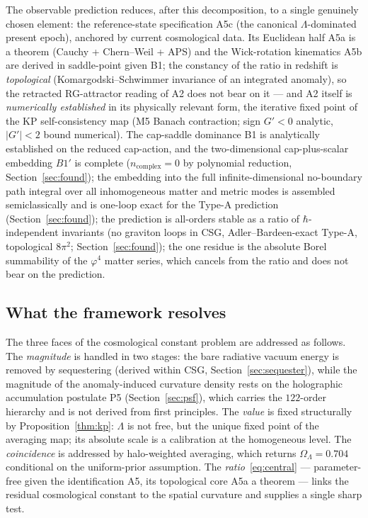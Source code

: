 \documentclass[11pt,a4paper]{article}
\theoremstyle{plain}
\theoremstyle{definition}
\theoremstyle{remark}
\newcommand{\OL}{\Omega_\Lambda}
\begin{document}
\noindent
The observable prediction reduces, after this decomposition, to a single genuinely chosen
element: the reference-state specification A5c (the canonical $\Lambda$-dominated present epoch),
anchored by current cosmological data. Its Euclidean half A5a is a theorem (Cauchy + Chern--Weil
+ APS) and the Wick-rotation kinematics A5b are derived in saddle-point given B1; the
constancy of the ratio in redshift is \emph{topological} (Komargodski--Schwimmer invariance of an
integrated anomaly), so the retracted RG-attractor reading of A2 does not bear on it --- and A2
itself is \emph{numerically established} in its physically relevant form, the iterative fixed point of the
KP self-consistency map (M5 Banach contraction; sign $G'<0$ analytic, $|G'|<2$ bound numerical). The cap-saddle dominance B1 is analytically established on the reduced cap-action, and the two-dimensional cap-plus-scalar embedding $B1'$ is complete ($n_{\mathrm{complex}}=0$ by polynomial reduction, Section~\ref{sec:found}); the embedding into the full infinite-dimensional no-boundary path integral over all inhomogeneous matter and metric modes is assembled semiclassically and is one-loop exact for the Type-A prediction (Section~\ref{sec:found}); the prediction is all-orders stable as a ratio of $\hbar$-independent invariants (no graviton loops in CSG, Adler--Bardeen-exact Type-A, topological $8\pi^2$; Section~\ref{sec:found}); the one residue is the absolute Borel summability of the $\varphi^4$ matter series, which cancels from the ratio and does not bear on the prediction.

\subsection{What the framework resolves}
The three faces of the cosmological constant problem are addressed as follows. The
\emph{magnitude} is handled in two stages: the bare radiative vacuum energy is removed by
sequestering (derived within CSG, Section~\ref{sec:sequester}), while the magnitude of the anomaly-induced curvature density
rests on the holographic accumulation postulate P5 (Section~\ref{sec:psf}), which carries the
$122$-order hierarchy and is not derived from first principles. The \emph{value} is fixed
structurally by Proposition~\ref{thm:kp}: $\Lambda$ is not free, but the unique fixed point of the
averaging map; its absolute scale is a calibration at the homogeneous level. The
\emph{coincidence} is addressed by halo-weighted averaging, which returns $\OL = 0.704$
conditional on the uniform-prior assumption. The \emph{ratio}~\eqref{eq:central} --- parameter-free
given the identification A5, its topological core A5a a theorem --- links the residual
cosmological constant to the spatial curvature and supplies a single sharp test.
\end{document}
